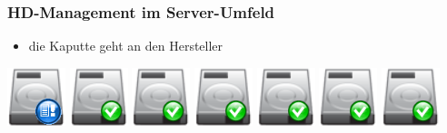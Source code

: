 \documentclass{beamer}
\begin{document}
  \frame
  {
    \frametitle{HD-Management im Server-Umfeld}

    \begin{itemize}
    \item{die Kaputte geht an den Hersteller}
    \end{itemize}

    \resizebox{40pt}{40pt}
    {
      \includegraphics{img/hdd_big_error.png}
    }
    \resizebox{40pt}{40pt}
    {
      \includegraphics{img/hdd_big_ok.png}
    }
    \resizebox{40pt}{40pt}
    {
      \includegraphics{img/hdd_big_ok.png}
    }
    \resizebox{40pt}{40pt}
    {
      \includegraphics{img/hdd_big_ok.png}
    }
    \resizebox{40pt}{40pt}
    {
      \includegraphics{img/hdd_big_ok.png}
    }
    \resizebox{40pt}{40pt}
    {
      \includegraphics{img/hdd_big_ok.png}
    }
    \resizebox{40pt}{40pt}
    {
      \includegraphics{img/hdd_big_ok.png}
    }
  }
\end{document}
